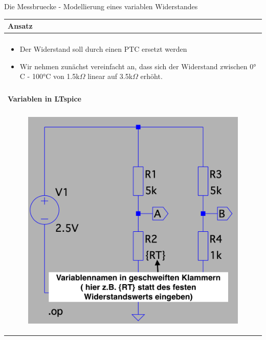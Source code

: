 \begin{frame}[t]{Die Messbruecke - Modellierung eines variablen Widerstandes}
  \begin{spacing}{0.9} \begin{tiny}
      \begin{table}[h!]
        \begin{tabular}{p{10cm}}
          \hline
          \textbf{Ansatz}               \\
          \hline                        \\
          \begin{minipage}{\textwidth}
            \begin{itemize}
              \item Der Widerstand soll durch einen PTC ersetzt werden
              \item Wir nehmen zunächst vereinfacht an, dass sich der Widerstand zwischen 0$°$C - 100$°$C von 1.5k$\Omega$ linear auf 3.5k$\Omega$ erhöht.
            \end{itemize}
          \end{minipage}
          \\
          \\
          \hline
          \textbf{Variablen in LTspice} \\
          \hline                        \\
          \begin{minipage}{\textwidth}
            \begin{figure}
              \centering
              \includegraphics[width=0.45\linewidth]{pictures/rt_var.png}
            \end{figure}
          \end{minipage}
          \\
        \end{tabular}

      \end{table}

    \end{tiny} \end{spacing}

\end{frame}


